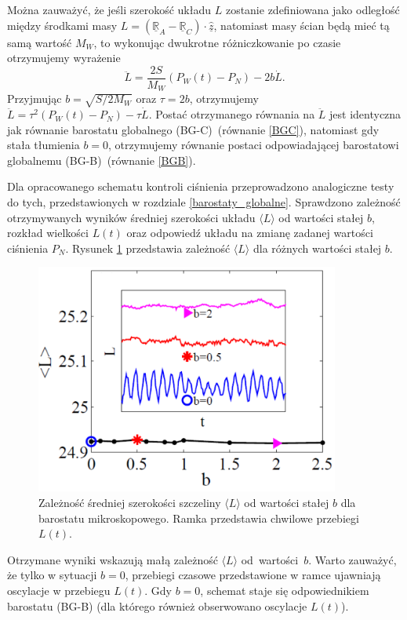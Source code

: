 \documentclass[12pt,a4paper,openright]{report} %
\begin{document}
Można zauważyć, że jeśli szerokość układu $L$ zostanie zdefiniowana jako odległość między środkami masy $L=(\underline{\mathbb{R}}_A - \underline{\mathbb{R}}_C) \cdot \underline{\hat{z}}$, natomiast masy ścian będą mieć tą samą wartość $M_W$, to wykonując dwukrotne różniczkowanie po czasie otrzymujemy wyrażenie\\
\begin{equation}
\ddot{L}=\frac{2S}{M_W}(P_W(t)-P_N) - 2b \dot{L}.
\end{equation}
%
Przyjmując $b=\sqrt{S/2M_W}$ oraz $\tau=2b$, otrzymujemy $\ddot{L}=\tau^2 (P_W(t)-P_N) - \tau \dot{L}$. Postać otrzymanego równania na $\ddot{L}$ jest identyczna jak równanie barostatu globalnego (BG-C)~(równanie \ref{BGC}), natomiast gdy stała tłumienia $b=0$, otrzymujemy równanie postaci odpowiadającej barostatowi globalnemu (BG-B)~(równanie \ref{BGB}). 

Dla opracowanego schematu kontroli ciśnienia przeprowadzono analogiczne testy do tych, przedstawionych w rozdziale \ref{barostaty_globalne}. Sprawdzono zależność otrzymywanych wyników średniej szerokości układu $\langle L \rangle$ od wartości stałej $b$, rozkład wielkości $L(t)$ oraz odpowiedź układu na zmianę zadanej wartości ciśnienia $P_N$. Rysunek \ref{BM-L-of-t} przedstawia zależność $\langle L \rangle$ dla różnych wartości stałej $b$.
\begin{figure}[h]
\centering
\includegraphics[width=100mm]{rysunki/PRE14_fig7.pdf}
\caption{Zależność średniej szerokości szczeliny $\langle L \rangle$ od wartości stałej $b$ dla barostatu mikroskopowego. Ramka przedstawia chwilowe przebiegi $L(t)$.}
\label{BM-L-of-t}
\end{figure}
Otrzymane wyniki wskazują małą zależność $\langle L \rangle$ od~wartości~$b$. Warto zauważyć, że tylko w sytuacji $b=0$, przebiegi czasowe przedstawione w ramce ujawniają oscylacje w przebiegu $L(t)$. Gdy $b=0$, schemat staje się odpowiednikiem barostatu (BG-B) (dla którego również obserwowano oscylacje $L(t)$). 
\end{document}
